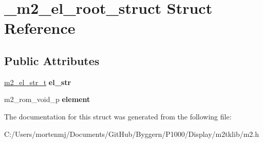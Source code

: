 \hypertarget{struct__m2__el__root__struct}{\section{\-\_\-m2\-\_\-el\-\_\-root\-\_\-struct Struct Reference}
\label{struct__m2__el__root__struct}
}
\subsection*{Public Attributes}
\begin{DoxyCompactItemize}
\item 
\hypertarget{struct__m2__el__root__struct_af58e1fa1c089943276cc1d20c1803792}{\hyperlink{struct__m2__el__str__struct}{m2\-\_\-el\-\_\-str\-\_\-t} {\bfseries el\-\_\-str}}\label{struct__m2__el__root__struct_af58e1fa1c089943276cc1d20c1803792}

\item 
\hypertarget{struct__m2__el__root__struct_a0cb13f9d1549b913a17fbb7b234c9633}{m2\-\_\-rom\-\_\-void\-\_\-p {\bfseries element}}\label{struct__m2__el__root__struct_a0cb13f9d1549b913a17fbb7b234c9633}

\end{DoxyCompactItemize}


The documentation for this struct was generated from the following file\-:\begin{DoxyCompactItemize}
\item 
C\-:/\-Users/mortenmj/\-Documents/\-Git\-Hub/\-Byggern/\-P1000/\-Display/m2tklib/m2.\-h\end{DoxyCompactItemize}
